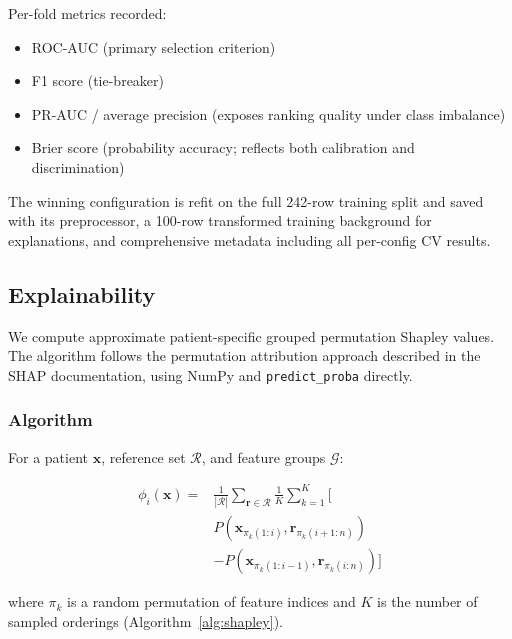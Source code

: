 \documentclass[conference]{IEEEtran}
\begin{document}
Per-fold metrics recorded:
\begin{itemize}
    \item ROC-AUC (primary selection criterion)
    \item F1 score (tie-breaker)
    \item PR-AUC / average precision (exposes ranking quality under class imbalance)
    \item Brier score (probability accuracy; reflects both calibration and discrimination)
\end{itemize}

The winning configuration is refit on the full 242-row training split and saved with its preprocessor, a 100-row transformed training background for explanations, and comprehensive metadata including all per-config CV results.

\subsection{Explainability}

We compute approximate patient-specific grouped permutation Shapley values. The algorithm follows the permutation attribution approach described in the SHAP documentation, using NumPy and \texttt{predict\_proba} directly.

\subsubsection{Algorithm}

For a patient $\mathbf{x}$, reference set $\mathcal{R}$, and feature groups $\mathcal{G}$:

\begin{equation}
\begin{split}
\phi_i(\mathbf{x}) ={}& \frac{1}{|\mathcal{R}|} \sum_{\mathbf{r} \in \mathcal{R}} \frac{1}{K} \sum_{k=1}^{K} \Big[ \\
& P(\mathbf{x}_{\pi_k(1:i)}, \mathbf{r}_{\pi_k(i+1:n)}) \\
& - P(\mathbf{x}_{\pi_k(1:i-1)}, \mathbf{r}_{\pi_k(i:n)}) \Big]
\end{split}
\end{equation}

where $\pi_k$ is a random permutation of feature indices and $K$ is the number of sampled orderings (Algorithm~\ref{alg:shapley}).
\end{document}
